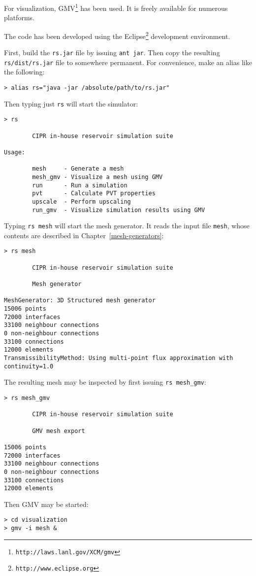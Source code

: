 For visualization, GMV\footnote{\texttt{http://laws.lanl.gov/XCM/gmv}}
has been used. It is freely available for numerous platforms.

The code has been developed using the
Eclipse\footnote{\texttt{http://www.eclipse.org}} development
environment.



First, build the \texttt{rs.jar} file by issuing \texttt{ant jar}.
Then copy the resulting \texttt{rs/dist/rs.jar} file to somewhere
permanent. For convenience, make an alias like the following:
\begin{verbatim}
> alias rs="java -jar /absolute/path/to/rs.jar"
\end{verbatim}
Then typing just \texttt{rs} will start the simulator:
\begin{verbatim}
> rs

        CIPR in-house reservoir simulation suite

Usage:

        mesh     - Generate a mesh
        mesh_gmv - Visualize a mesh using GMV
        run      - Run a simulation
        pvt      - Calculate PVT properties
        upscale  - Perform upscaling
        run_gmv  - Visualize simulation results using GMV
\end{verbatim}



Typing \texttt{rs mesh} will start the mesh generator. It reads the
input file \texttt{mesh}, whose contents are described in
Chapter~\ref{mesh-generators}:
\begin{verbatim}
> rs mesh

        CIPR in-house reservoir simulation suite

        Mesh generator

MeshGenerator: 3D Structured mesh generator
15006 points
72000 interfaces
33100 neighbour connections
0 non-neighbour connections
33100 connections
12000 elements
TransmissibilityMethod: Using multi-point flux approximation with continuity=1.0
\end{verbatim}
The resulting mesh may be inspected by first issuing \texttt{rs
  mesh\_gmv}:
\begin{verbatim}
> rs mesh_gmv

        CIPR in-house reservoir simulation suite

        GMV mesh export

15006 points
72000 interfaces
33100 neighbour connections
0 non-neighbour connections
33100 connections
12000 elements
\end{verbatim}
Then GMV may be started:
\begin{verbatim}
> cd visualization
> gmv -i mesh &
\end{verbatim}

